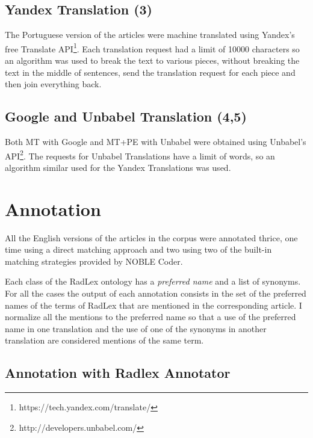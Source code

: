\subsection{Yandex Translation (3)}

The Portuguese version of the articles were machine translated using Yandex's free Translate API\footnote{https://tech.yandex.com/translate/}. Each translation request had a limit of 10000 characters so an algorithm was used to break the text to various pieces, without breaking the text in the middle of sentences, send the translation request for each piece and then join everything back.

\subsection{Google and Unbabel Translation (4,5)}

Both MT with Google and MT+PE with Unbabel were obtained using Unbabel's API\footnote{http://developers.unbabel.com/}. The requests for Unbabel Translations have a limit of words, so an algorithm similar used for the Yandex Translations was used. 

\section{Annotation}

All the English versions of the articles in the corpus were annotated thrice, one time using a direct matching approach and two using two of the built-in matching strategies provided by NOBLE Coder. 

Each class of the RadLex ontology has a \textit{preferred name} and a list of synonyms. For all the cases the output of each annotation consists in the set of the preferred names of the terms of RadLex that are mentioned in the corresponding article. I normalize all the mentions to the preferred name so that a use of the preferred name in one translation and the use of one of the synonyms in another translation are considered mentions of the same term. 

\subsection{Annotation with Radlex Annotator}

